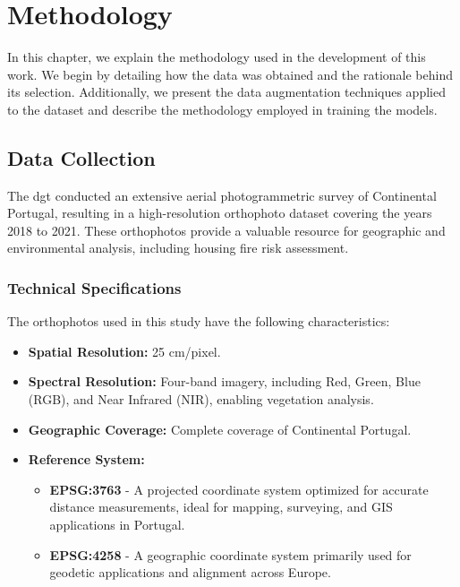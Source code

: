 %


\chapter{Methodology}
\label{cha:methodology}

In this chapter, we explain the methodology used in the development of this work. We begin 
by detailing how the data was obtained and the rationale behind its selection. Additionally, we 
present the data augmentation techniques applied to the dataset and describe the methodology 
employed in training the models.

\section{Data Collection}

The \gls{dgt} conducted an extensive aerial photogrammetric survey of Continental Portugal, 
resulting in a high-resolution orthophoto dataset covering the years 2018 to 2021. 
These orthophotos provide a valuable resource for geographic and environmental analysis, 
including housing fire risk assessment.

\subsection{Technical Specifications}
The orthophotos used in this study have the following characteristics:

\begin{itemize}
    \item \textbf{Spatial Resolution:} 25 cm/pixel.
    \item \textbf{Spectral Resolution:} Four-band imagery, including Red, Green, Blue (RGB), 
          and Near Infrared (NIR), enabling vegetation analysis.
    \item \textbf{Geographic Coverage:} Complete coverage of Continental Portugal.
    \item \textbf{Reference System:} 
        \begin{itemize}
            \item \textbf{EPSG:3763} - A projected coordinate system optimized for accurate 
                  distance measurements, ideal for mapping, surveying, and GIS applications in Portugal.
            \item \textbf{EPSG:4258} - A geographic coordinate system primarily used for geodetic 
                  applications and alignment across Europe.
        \end{itemize}
\end{itemize}

